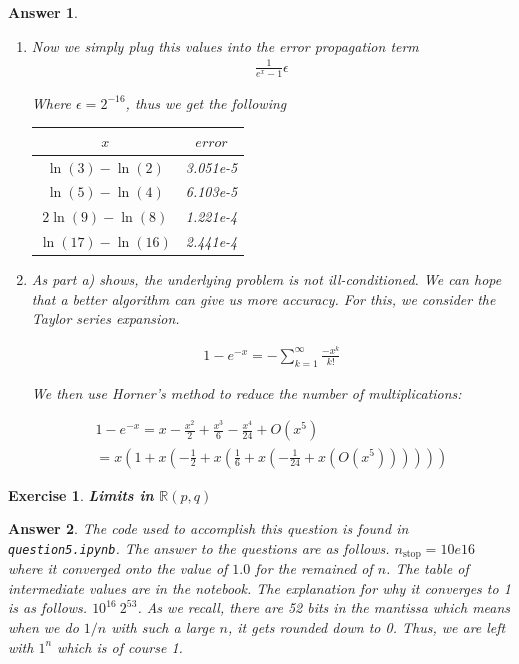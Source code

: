 \documentclass[12pt]{article}
\theoremstyle{colon}
\newtheorem{exercise}{Exercise}
\newtheorem*{answer}{Answer}
\begin{document}
\begin{answer}
\begin{enumerate}[label=\alph*)]
    \item Now we simply plug this values into the error propagation term
      \begin{gather*}
        \frac{1}{e^x-1} \epsilon
      \end{gather*}

      Where $\epsilon = 2^{-16}$, thus we get the following
      \begin{center}
        \begin{tabular}{ c | c }
          $x$ & $error$ \\
          \hline
          $\ln(3)-\ln(2)$   & 3.051e-5 \\
          $\ln(5)-\ln(4)$   & 6.103e-5 \\
          $2\ln(9)-\ln(8)$  & 1.221e-4 \\
          $\ln(17)-\ln(16)$ & 2.441e-4 \\
        \end{tabular}
      \end{center}

    \item As part a) shows, the underlying problem is not ill-conditioned. We can hope that a better algorithm can give us more accuracy. For this, we consider the Taylor series expansion.

    \begin{gather*}
      1-e^{-x} = - \sum_{k=1}^\infty \frac{-x^k}{k!}
    \end{gather*}

    We then use Horner's method to reduce the number of multiplications:

    \begin{gather*}
      1-e^{-x} = x - \frac{x^2}{2} + \frac{x^3}{6} - \frac{x^4}{24} + O(x^5) \\
      = x \left(1+x \left(-\frac{1}{2}+x \left(\frac{1}{6}+x \left(-\frac{1}{24}+x \left(O(x^5) \right) \right) \right) \right) \right)
    \end{gather*}

  \end{enumerate}
\end{answer}

\clearpage

\begin{exercise}
  \textbf{Limits in $\mathbb{R}(p,q)$}
\end{exercise}

\begin{answer}
  The code used to accomplish this question is found in \texttt{question5.ipynb}. The answer to the questions are as follows. $n_{\text{stop}} = 10e16$ where it converged onto the value of $1.0$ for the remained of $n$. The table of intermediate values are in the notebook. The explanation for why it converges to 1 is as follows. $10^16 ~ 2^53$. As we recall, there are 52 bits in the mantissa which means when we do $1/n$ with such a large $n$, it gets rounded down to 0. Thus, we are left with $1^n$ which is of course 1.
\end{answer}
\end{document}
